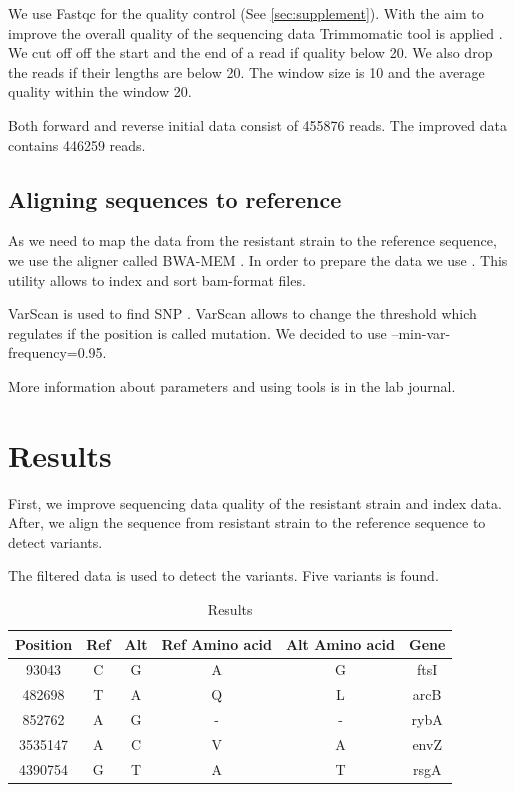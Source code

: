 \documentclass{article}
\begin{document}
We use Fastqc for the quality control \cite{fqc} (See \ref{sec:supplement}).  With the aim to improve the overall quality of the sequencing data Trimmomatic tool is applied \cite{trim}. We cut off  off the start and the end of a read if quality below 20. We also drop the reads if their lengths are below 20. The window size is 10 and  the average quality  within the window 20. 

 Both forward and reverse initial data consist of 455876 reads. The improved data contains 446259 reads.  \\

\subsection{Aligning sequences to reference}
As we need to map the data from the resistant strain to the reference sequence, we use the aligner called BWA-MEM \cite{bwa}. In order to prepare the data we use \cite{sam}. This utility allows to index and sort bam-format files.

VarScan is used to find SNP \cite{var}. VarScan allows to change the threshold which regulates if  the position is called mutation. We decided to use --min-var-frequency=0.95.

More information about parameters and using tools is in the lab journal.  

\section{Results}
First, we improve sequencing data quality of the resistant strain and index data. After, we align the sequence from resistant strain to the reference sequence to detect variants. 
 

The filtered data is used to detect the variants. Five variants is found. 

\begin{table}[h!]
\centering
\begin{tabular}{||c c c c c c  ||} 
 \hline
Position  & Ref & Alt  & Ref Amino acid & Alt  Amino acid & Gene   \\ [0.5ex] 
 \hline\hline
93043 & C & G & A &  G& ftsI \\ 
482698 & T & A  & Q & L  & arcB  \\
852762 & A & G & - & - & rybA \\
3535147 & A & C & V& A&  envZ \\ 
4390754 & G & T & A& T&  rsgA \\ [1ex] 
 \hline
\end{tabular}
\caption{Results }
\label{table:2}
\end{table}
\end{document}

